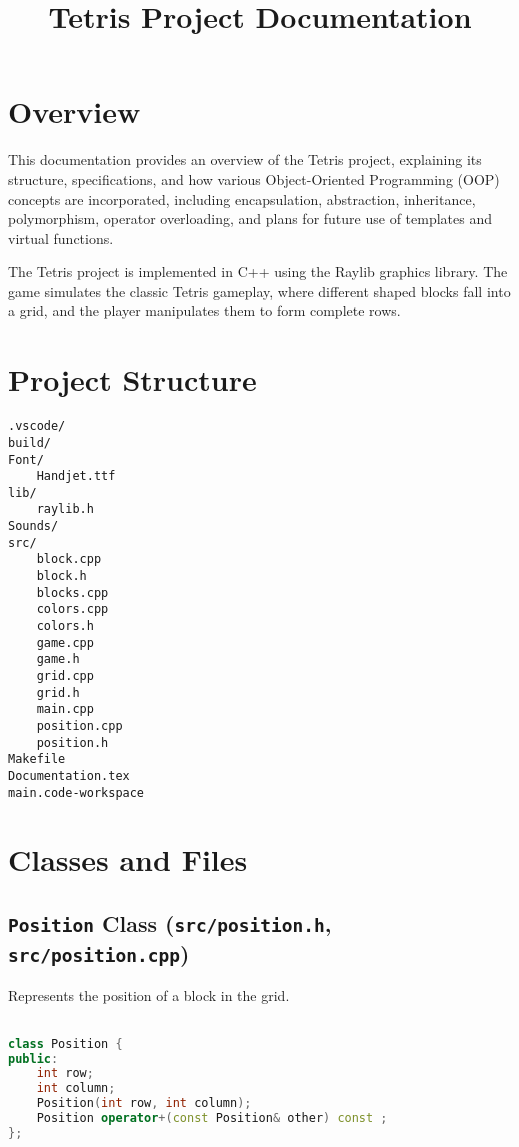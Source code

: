 \documentclass{article}
\begin{document}
\title{Tetris Project Documentation}
\author{}
\date{}
\maketitle

\section{Overview}

This documentation provides an overview of the Tetris project, explaining its structure, specifications, and how various Object-Oriented Programming (OOP) concepts are incorporated, including encapsulation, abstraction, inheritance, polymorphism, operator overloading, and plans for future use of templates and virtual functions.

The Tetris project is implemented in C++ using the Raylib graphics library. The game simulates the classic Tetris gameplay, where different shaped blocks fall into a grid, and the player manipulates them to form complete rows.

\section{Project Structure}

\begin{verbatim}
.vscode/
build/
Font/
    Handjet.ttf
lib/
    raylib.h
Sounds/
src/
    block.cpp
    block.h
    blocks.cpp
    colors.cpp
    colors.h
    game.cpp
    game.h
    grid.cpp
    grid.h
    main.cpp
    position.cpp
    position.h
Makefile
Documentation.tex
main.code-workspace
\end{verbatim}

\section{Classes and Files}

\subsection{\texttt{Position} Class (\texttt{src/position.h}, \texttt{src/position.cpp})}

Represents the position of a block in the grid.

\begin{lstlisting}[language=C++]

class Position {
public:
    int row;
    int column;
    Position(int row, int column);
    Position operator+(const Position& other) const ;
};
\end{lstlisting}
\end{document}
